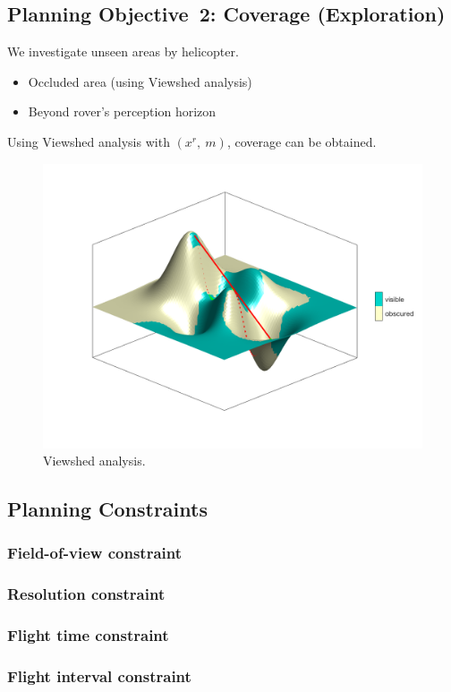 \documentclass[conference]{IEEEtran}
\begin{document}
\subsection{Planning Objective~2: Coverage (Exploration)}
We investigate unseen areas by helicopter.
\begin{itemize}
    \item Occluded area (using Viewshed analysis)
    \item Beyond rover’s perception horizon
\end{itemize}
Using Viewshed analysis with $(x^r,~m)$, coverage can be obtained.
\begin{figure}[b]
		\centering
		\includegraphics[width=1.0\columnwidth]{figs/vs.png}
		\caption{Viewshed analysis.}
		\label{fig:vs}
\end{figure}


\subsection{Planning Constraints}
\subsubsection{Field-of-view constraint}
\subsubsection{Resolution constraint}
\subsubsection{Flight time constraint}
\subsubsection{Flight interval constraint}
~


\end{document}
